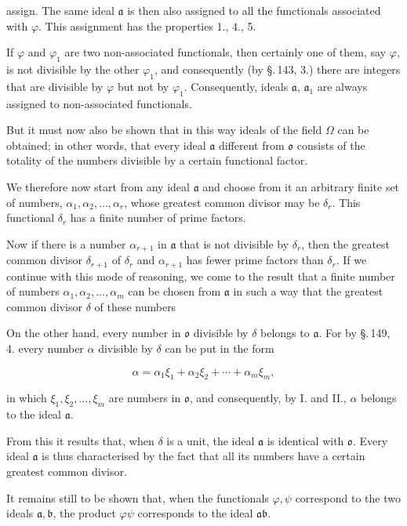 assign. The same ideal $\mathfrak{a}$ is then also assigned to all the
functionals associated with $\varphi$. This assignment has the
properties 1., 4., 5.

If $\varphi$ and $\varphi_1$ are two non-associated functionals, then certainly
one of them, say $\varphi$, is not divisible by the other $\varphi_1$,
and consequently (by \S.\,143, 3.) there are integers that are
divisible by $\varphi$ but not by $\varphi_1$. Consequently, 
ideals $\mathfrak{a}$, $\mathfrak{a}_1$ are always assigned to non-associated functionals.

But it must now also be shown that in this way 
ideals of the field $\Omega$ can be obtained; in other words, that
every ideal $\mathfrak{a}$ different from $\mathfrak{o}$ consists of the totality
of the numbers divisible by a certain functional factor.

We therefore now start from any ideal $\mathfrak{a}$ and
choose from it an arbitrary finite set of numbers,
$\alpha_1, \alpha_2, \ldots, \alpha_r$, whose greatest common divisor may be
$\delta_r$. This functional $\delta_r$ has a finite number of prime
factors.

Now if there is a number $\alpha_{r+1}$ in $\mathfrak{a}$ that is not divisible
by $\delta_r$, then the greatest common divisor $\delta_{r+1}$ of
$\delta_r$ and $\alpha_{r+1}$ has fewer prime factors than $\delta_r$. If we
continue with this mode of reasoning, we come to the result that
a finite number of numbers $\alpha_1, \alpha_2, \ldots, \alpha_m$ can be chosen
from $\mathfrak{a}$ in such a way that the greatest common divisor $\delta$ of these
numbers 

On the other hand, every number in $\mathfrak{o}$ divisible by $\delta$ belongs to $\mathfrak{a}$.
For by \S.\,149, 4. every number $\alpha$ divisible by $\delta$ can be
put in the form

\[
\alpha = \alpha_1 \xi_1 + \alpha_2 \xi_2 + \cdots + \alpha_m \xi_m,
\]

in which $\xi_1, \xi_2, \ldots, \xi_m$ are numbers in $\mathfrak{o}$, and consequently,
by I. and II., $\alpha$ belongs to the ideal $\mathfrak{a}$.

From this it results that, when $\delta$ is a unit, the
ideal $\mathfrak{a}$ is identical with $\mathfrak{o}$. Every ideal $\mathfrak{a}$ is thus
characterised by the fact that all its numbers have a certain greatest
common divisor.

It remains still to be shown that, when the functionals $\varphi, \psi$
correspond to the two ideals $\mathfrak{a}, \mathfrak{b}$, the product $\varphi\psi$
corresponds to the ideal $\mathfrak{a}\mathfrak{b}$.
